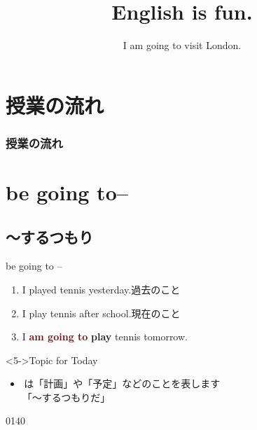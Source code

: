 \documentclass[aspectratio=169,xcolor={dvipsnames,table}]{beamer}
\title{English is fun.}
\subtitle{I am going to visit London.}
\author{}
\institute[]{}
\date[]
\newcommand{\myaudio}[1]{\href{#1}{\faVolumeUp}}
\begin{document}
\begin{frame}[plain]
  \titlepage
\end{frame}


\section*{授業の流れ}
\begin{frame}[plain]
  \frametitle{授業の流れ}
  \tableofcontents
\end{frame}



\section{be going to--}

\subsection{〜するつもり}
\begin{frame}[plain]{be going to --}
\Large
\begin{enumerate}
 \item<1-> I played tennis yesterday.\hfill{}{\small 過去のこと}
 \item<2-> I play tennis after school.\hfill{}{\small 現在のこと}
 \item<3-> I \textcolor{Maroon}{\bfseries am going to} {\bfseries play} tennis tomorrow.%
\hfill{}
\end{enumerate}

\vfill

\begin{exampleblock}<5->{Topic for Today}
\small
\begin{itemize}[square]
 \item {}\,は「計画」や「予定」などのことを表します\\
\hfill{}「～するつもりだ」
\end{itemize}
\end{exampleblock}
\hfill{\tiny 0140}\,{\scriptsize \myaudio{./audio/011_be_going_to_01.mp3}}
\end{frame}
\end{document}
